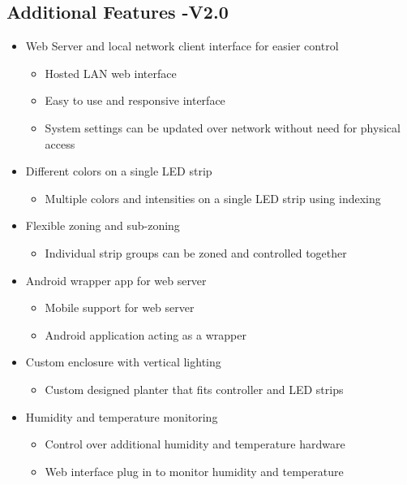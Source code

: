 \documentclass[onecolumn, draftclsnofoot,10pt, compsoc]{article}
\begin{document}
\subsection{Additional Features -V2.0}
\begin{itemize}
	\item Web Server and local network client interface for easier control
	\begin{itemize}
		\item Hosted LAN web interface
		\item Easy to use and responsive interface
		\item System settings can be updated over network without need for physical access
	\end{itemize}
\end{itemize}
\begin{itemize}
	\item Different colors on a single LED strip
	\begin{itemize}
		\item Multiple colors and intensities on a single LED strip using indexing
	\end{itemize}
\end{itemize}
\begin{itemize}
	\item Flexible zoning and sub-zoning
	\begin{itemize}
		\item Individual strip groups can be zoned and controlled together
	\end{itemize}
\end{itemize}
\begin{itemize}
	\item Android wrapper app for web server
	\begin{itemize}
		\item Mobile support for web server
		\item Android application acting as a wrapper
	\end{itemize}
\end{itemize}
\begin{itemize}
	\item Custom enclosure with vertical lighting
	\begin{itemize}
		\item Custom designed planter that fits controller and LED strips
	\end{itemize}
\end{itemize}
\begin{itemize}
	\item Humidity and temperature monitoring
	\begin{itemize}
		\item Control over additional humidity and temperature hardware
		\item Web interface plug in to monitor humidity and temperature
	\end{itemize}
\end{itemize}
\end{document}
